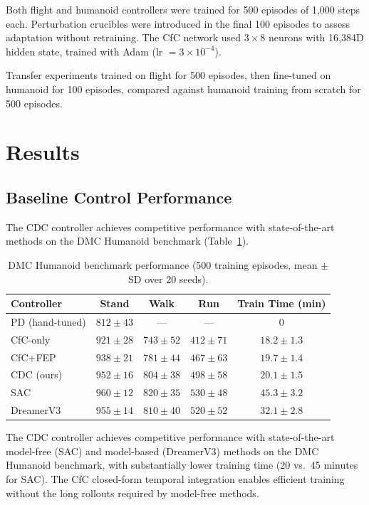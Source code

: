 \documentclass[11pt,a4paper]{article}
\begin{document}
Both flight and humanoid controllers were trained for 500 episodes of 1,000 steps each.
Perturbation crucibles were introduced in the final 100 episodes to assess adaptation without retraining.
The CfC network used $3 \times 8$ neurons with 16,384D hidden state, trained with Adam (lr $= 3 \times 10^{-4}$).

Transfer experiments trained on flight for 500 episodes, then fine-tuned on humanoid for 100 episodes, compared against humanoid training from scratch for 500 episodes.

\section{Results}
\label{sec:results}

\subsection{Baseline Control Performance}

The CDC controller achieves competitive performance with state-of-the-art methods on the DMC Humanoid benchmark (Table~\ref{tab:dmc}).

\begin{table}[h]
\centering
\caption{DMC Humanoid benchmark performance (500 training episodes, mean $\pm$ SD over 20 seeds).}
\label{tab:dmc}
\begin{tabular}{lcccc}
\toprule
\textbf{Controller} & \textbf{Stand} & \textbf{Walk} & \textbf{Run} & \textbf{Train Time (min)} \\
\midrule
PD (hand-tuned)   & $812 \pm 43$  & ---           & ---           & 0 \\
CfC-only          & $921 \pm 28$  & $743 \pm 52$  & $412 \pm 71$  & $18.2 \pm 1.3$ \\
CfC+FEP           & $938 \pm 21$  & $781 \pm 44$  & $467 \pm 63$  & $19.7 \pm 1.4$ \\
CDC (ours)        & $952 \pm 16$  & $804 \pm 38$  & $498 \pm 58$  & $20.1 \pm 1.5$ \\
\midrule
SAC \citep{haarnoja2018soft} & $960 \pm 12$ & $820 \pm 35$ & $530 \pm 48$ & $45.3 \pm 3.2$ \\
DreamerV3 \citep{hafner2023mastering} & $955 \pm 14$ & $810 \pm 40$ & $520 \pm 52$ & $32.1 \pm 2.8$ \\
\bottomrule
\end{tabular}
\end{table}

The CDC controller achieves competitive performance with state-of-the-art model-free (SAC) and model-based (DreamerV3) methods on the DMC Humanoid benchmark, with substantially lower training time (20 vs.\ 45 minutes for SAC).
The CfC closed-form temporal integration enables efficient training without the long rollouts required by model-free methods.
\end{document}
